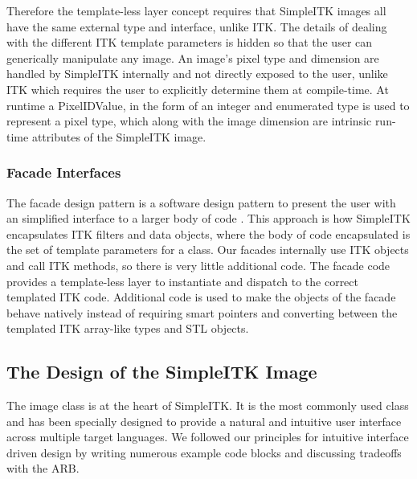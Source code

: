 \documentclass{frontiersMED} %
\begin{document}
Therefore the template-less layer concept requires that SimpleITK
images all have the same external type and interface, unlike ITK. The
details of dealing with the different ITK template parameters is
hidden so that the user can generically manipulate any image. An
image's pixel type and dimension are handled by SimpleITK internally
and not directly exposed to the user, unlike ITK which requires the
user to explicitly determine them at compile-time. At runtime a
PixelIDValue, in the form of an integer and enumerated type is used to
represent a pixel type, which along with the image dimension are
intrinsic run-time attributes of the SimpleITK image.

\subsubsection{Facade Interfaces}
The facade design pattern is a software design pattern to present the
user with an simplified interface to a larger body of code
\cite{Gamma1995}. This approach is how SimpleITK encapsulates ITK filters
and data objects, where  the body of code encapsulated is the set of
template parameters for a class. Our facades internally use ITK
objects and call ITK methods, so there is very little additional
code. The facade code provides a template-less layer to instantiate
and dispatch to the correct templated ITK code. Additional code is
used to make the objects of the facade behave natively instead of
requiring smart pointers and converting between the templated ITK
array-like types and STL objects.

\subsection{The Design of the SimpleITK Image}
The image class is at the heart of SimpleITK. It is the most commonly
used class and has been specially designed to provide a natural and
intuitive user interface across multiple target languages. We followed
our principles for intuitive interface driven design by writing
numerous example code blocks and discussing tradeoffs with the ARB.
\end{document}

